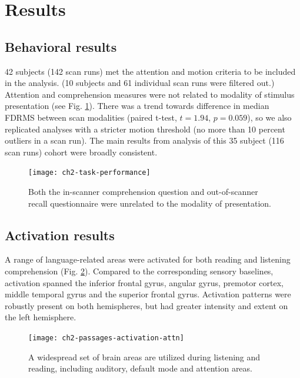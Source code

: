 \section{Results}

\subsection{Behavioral results}

42 subjects (142 scan runs) met the attention and motion criteria to be included in the analysis. (10 subjects and 61 individual scan runs were filtered out.) Attention and comprehension measures were not related to modality of stimulus presentation (see Fig. \ref{fig:ch2-task-performance}). There was a trend towards difference in median FDRMS between scan modalities (paired t-test, $t = 1.94$, $p = 0.059$), so we also replicated analyses with a stricter motion threshold (no more than 10 percent outliers in a scan run). The main results from analysis of this 35 subject (116 scan runs) cohort were broadly consistent.

\begin{figure}[t]
	\centering
	\texttt{[image: ch2-task-performance]}
    \caption[Behavioral metrics of passage performance were unrelated to modality.]{Both the in-scanner comprehension question and out-of-scanner recall questionnaire were unrelated to the modality of presentation.}
	\label{fig:ch2-task-performance}
\end{figure}

\subsection{Activation results}

A range of language-related areas were activated for both reading and listening comprehension (Fig. \ref{fig:ch2-passages-activation-attn}). Compared to the corresponding sensory baselines, activation spanned the inferior frontal gyrus, angular gyrus, premotor cortex, middle temporal gyrus and the superior frontal gyrus. Activation patterns were robustly present on both hemispheres, but had greater intensity and extent on the left hemisphere. 

\begin{figure}[t]
	\centering
	\texttt{[image: ch2-passages-activation-attn]}
    \caption[There is significant overlap between the areas used in listening and reading.]{A widespread set of brain areas are utilized during listening and reading, including auditory, default mode and attention areas.}
	\label{fig:ch2-passages-activation-attn}
\end{figure}

